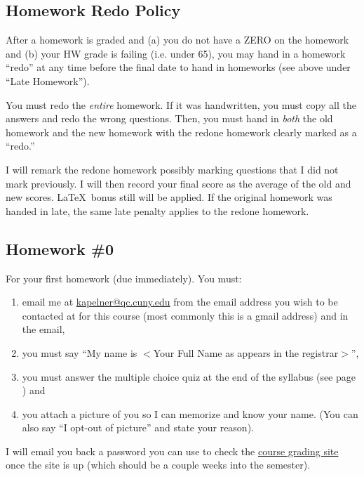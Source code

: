 \documentclass[12pt]{article}
\newcommand{\qu}[1]{``#1''}
\begin{document}
\subsection*{Homework Redo Policy}

After a homework is graded and (a) you do not have a ZERO on the homework and (b) your HW grade is failing (i.e. under 65), you may hand in a homework \qu{redo} at any time before the final date to hand in homeworks (see above under \qu{Late Homework}). 

You must redo the \textit{entire} homework. If it was handwritten, you must copy all the answers and redo the wrong questions. Then, you must hand in \textit{both} the old homework and the new homework with the redone homework clearly marked as a \qu{redo.}

I will remark the redone homework possibly marking questions that I did not mark previously. I will then record your final score as the average of the old and new scores. \LaTeX~bonus still will be applied. If the original homework was handed in late, the same late penalty applies to the redone homework.

\subsection*{Homework \#0}

For your first homework (due immediately). You must:

\begin{enumerate}[(1)]
\item email me at \href{kapelner@qc.cuny.edu}{kapelner@qc.cuny.edu} from the email address you wish to be contacted at for this course (most commonly this is a gmail address) and in the email,
\item you must say \qu{My name is $<$Your Full Name as appears in the registrar$>$},
\item you must answer the multiple choice quiz at the end of the syllabus (see page \pageref{quiz}) and
\item you attach a picture of you so I can memorize and know your name. (You can also say \qu{I opt-out of picture} and state your reason).
\end{enumerate}

I will email you back a password you can use to check the \href{http://gradesly.com}{course grading site} once the site is up (which should be a couple weeks into the semester). \\
\end{document}

